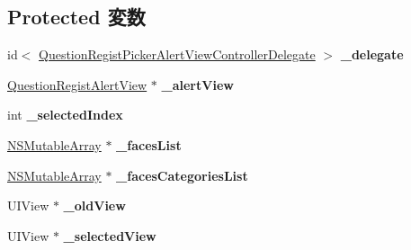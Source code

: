 \subsection*{Protected 変数}
\begin{DoxyCompactItemize}
\item 
\hypertarget{interface_question_regist_picker_alert_view_controller_a0a46e4e6debc7098796ed24cef83baf5}{
id$<$ \hyperlink{protocol_question_regist_picker_alert_view_controller_delegate-p}{QuestionRegistPickerAlertViewControllerDelegate} $>$ {\bfseries \_\-delegate}}
\label{interface_question_regist_picker_alert_view_controller_a0a46e4e6debc7098796ed24cef83baf5}

\item 
\hypertarget{interface_question_regist_picker_alert_view_controller_a62f68ce15fc0d0efc64a4e0ccdbdadc4}{
\hyperlink{interface_question_regist_alert_view}{QuestionRegistAlertView} $\ast$ {\bfseries \_\-alertView}}
\label{interface_question_regist_picker_alert_view_controller_a62f68ce15fc0d0efc64a4e0ccdbdadc4}

\item 
\hypertarget{interface_question_regist_picker_alert_view_controller_a4d70227a83455bd6df74c3a311d19ab2}{
int {\bfseries \_\-selectedIndex}}
\label{interface_question_regist_picker_alert_view_controller_a4d70227a83455bd6df74c3a311d19ab2}

\item 
\hypertarget{interface_question_regist_picker_alert_view_controller_a477a532f67e422643c04c971de5266c1}{
\hyperlink{class_n_s_mutable_array}{NSMutableArray} $\ast$ {\bfseries \_\-facesList}}
\label{interface_question_regist_picker_alert_view_controller_a477a532f67e422643c04c971de5266c1}

\item 
\hypertarget{interface_question_regist_picker_alert_view_controller_ae16f300fb188cf96ad2d75a983328c55}{
\hyperlink{class_n_s_mutable_array}{NSMutableArray} $\ast$ {\bfseries \_\-facesCategoriesList}}
\label{interface_question_regist_picker_alert_view_controller_ae16f300fb188cf96ad2d75a983328c55}

\item 
\hypertarget{interface_question_regist_picker_alert_view_controller_a189dd65eb0f61dfa3cfca69b96caf7a6}{
UIView $\ast$ {\bfseries \_\-oldView}}
\label{interface_question_regist_picker_alert_view_controller_a189dd65eb0f61dfa3cfca69b96caf7a6}

\item 
\hypertarget{interface_question_regist_picker_alert_view_controller_a0566afab2dad024f44ef539920076baf}{
UIView $\ast$ {\bfseries \_\-selectedView}}
\label{interface_question_regist_picker_alert_view_controller_a0566afab2dad024f44ef539920076baf}

\end{DoxyCompactItemize}
